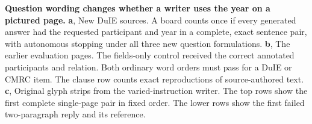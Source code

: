 \textbf{Question wording changes whether a writer uses the year on a pictured page.}
\textbf{a}, New DuIE sources. A board counts once if every generated answer had the requested participant and year in a complete, exact sentence pair, with autonomous stopping under all three new question formulations.
\textbf{b}, The earlier evaluation pages. The fields-only control received the correct annotated participants and relation. Both ordinary word orders must pass for a DuIE or CMRC item. The clause row counts exact reproductions of source-authored text.
\textbf{c}, Original glyph strips from the varied-instruction writer. The top rows show the first complete single-page pair in fixed order. The lower rows show the first failed two-paragraph reply and its reference.
